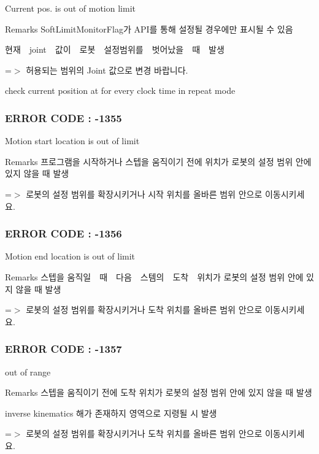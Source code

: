 Current pos. is out of motion limit \begin{DoxyRemark}{Remarks}
Soft\-Limit\-Monitor\-Flag가 A\-P\-I를 통해 설정될 경우에만 표시될 수 있음 \par
 현재　joint　값이　로봇　설정범위를　벗어났을　때　발생 \par
 =$>$ 허용되는 범위의 Joint 값으로 변경 바랍니다. 

check current position at for every clock time in repeat mode
\end{DoxyRemark}


 \subsubsection*{E\-R\-R\-O\-R C\-O\-D\-E \-: -\/1355 }

Motion start location is out of limit \begin{DoxyRemark}{Remarks}
프로그램을 시작하거나 스텝을 움직이기 전에 위치가 로봇의 설정 범위 안에 있지 않을 때 발생 \par
 =$>$ 로봇의 설정 범위를 확장시키거나 시작 위치를 올바른 범위 안으로 이동시키세요.
\end{DoxyRemark}


 \subsubsection*{E\-R\-R\-O\-R C\-O\-D\-E \-: -\/1356 }

Motion end location is out of limit \begin{DoxyRemark}{Remarks}
스텝을 움직일　때　다음　스템의　도착　위치가 로봇의 설정 범위 안에 있지 않을 때 발생 \par
 =$>$ 로봇의 설정 범위를 확장시키거나 도착 위치를 올바른 범위 안으로 이동시키세요.
\end{DoxyRemark}


 \subsubsection*{E\-R\-R\-O\-R C\-O\-D\-E \-: -\/1357 }

out of range \begin{DoxyRemark}{Remarks}
스텝을 움직이기 전에 도착 위치가 로봇의 설정 범위 안에 있지 않을 때 발생 \par
 inverse kinematics 해가 존재하지 영역으로 지령될 시 발생 \par
 =$>$ 로봇의 설정 범위를 확장시키거나 도착 위치를 올바른 범위 안으로 이동시키세요.
\end{DoxyRemark}


